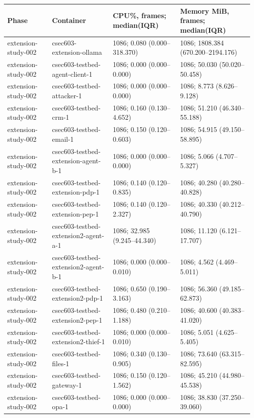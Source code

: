\begin{tabular}{llll}
\hline
Phase & Container & CPU\%, frames; median(IQR) & Memory MiB, frames; median(IQR) \\
\hline
extension-study-002 & csec603-extension-ollama & 1086; 0.080 (0.000--318.370) & 1086; 1808.384 (670.200--2194.176) \\
extension-study-002 & csec603-testbed-agent-client-1 & 1086; 0.000 (0.000--0.000) & 1086; 50.030 (50.020--50.458) \\
extension-study-002 & csec603-testbed-attacker-1 & 1086; 0.000 (0.000--0.000) & 1086; 8.773 (8.626--9.128) \\
extension-study-002 & csec603-testbed-crm-1 & 1086; 0.160 (0.130--4.652) & 1086; 51.210 (46.340--55.188) \\
extension-study-002 & csec603-testbed-email-1 & 1086; 0.150 (0.120--0.603) & 1086; 54.915 (49.150--58.895) \\
extension-study-002 & csec603-testbed-extension-agent-b-1 & 1086; 0.000 (0.000--0.000) & 1086; 5.066 (4.707--5.327) \\
extension-study-002 & csec603-testbed-extension-pdp-1 & 1086; 0.140 (0.120--0.835) & 1086; 40.280 (40.280--40.828) \\
extension-study-002 & csec603-testbed-extension-pep-1 & 1086; 0.140 (0.120--2.327) & 1086; 40.330 (40.212--40.790) \\
extension-study-002 & csec603-testbed-extension2-agent-a-1 & 1086; 32.985 (9.245--44.340) & 1086; 11.120 (6.121--17.707) \\
extension-study-002 & csec603-testbed-extension2-agent-b-1 & 1086; 0.000 (0.000--0.010) & 1086; 4.562 (4.469--5.011) \\
extension-study-002 & csec603-testbed-extension2-pdp-1 & 1086; 0.650 (0.190--3.163) & 1086; 56.360 (49.185--62.873) \\
extension-study-002 & csec603-testbed-extension2-pep-1 & 1086; 0.480 (0.210--1.188) & 1086; 40.600 (40.383--41.020) \\
extension-study-002 & csec603-testbed-extension2-thief-1 & 1086; 0.000 (0.000--0.010) & 1086; 5.051 (4.625--5.405) \\
extension-study-002 & csec603-testbed-files-1 & 1086; 0.340 (0.130--0.905) & 1086; 73.640 (63.315--82.595) \\
extension-study-002 & csec603-testbed-gateway-1 & 1086; 0.150 (0.120--1.562) & 1086; 45.210 (44.980--45.538) \\
extension-study-002 & csec603-testbed-opa-1 & 1086; 0.000 (0.000--0.000) & 1086; 38.830 (37.250--39.060) \\

\end{tabular}
